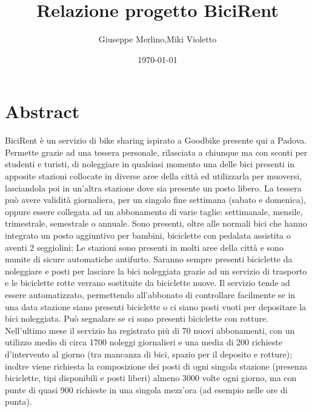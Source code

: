 \documentclass[a4paper,twoside]{article}
\author{Giuseppe Merlino,Miki Violetto}
\title{Relazione progetto BiciRent}
\date{\today}
\begin{document}
\maketitle

\newpage
\tableofcontents
\newpage


\section{Abstract}
BiciRent è un servizio di bike sharing ispirato a Goodbike presente qui a Padova.\newline
Permette grazie ad una tessera personale, rilasciata a chiunque ma con sconti per studenti e turisti, di noleggiare in qualsiasi momento una delle bici presenti in apposite stazioni collocate in diverse aree della città ed utilizzarla per muoversi, lasciandola poi in un'altra stazione dove sia presente un posto libero.\newline
La tessera può avere validità giornaliera, per un singolo fine settimana (sabato e domenica), oppure essere collegata ad un abbonamento di varie taglie: settimanale, mensile, trimestrale, semestrale o  annuale.\newline
Sono presenti, oltre alle normali bici che hanno integrato un posto aggiuntivo per bambini, biciclette con pedalata assistita o aventi 2 seggiolini;\newline
Le stazioni sono presenti in molti aree della città e sono munite di sicure automatiche antifurto. Saranno sempre presenti biciclette da noleggiare e posti per lasciare la bici noleggiata grazie ad un servizio di trasporto e le biciclette rotte verrano sostituite da biciclette nuove.\newline
Il servizio tende ad essere automatizzato, permettendo all'abbonato di controllare facilmente se in una data stazione siano presenti biciclette o ci siano posti vuoti per depositare la bici noleggiata. Può segnalare se ci sono presenti biciclette con rotture.\newline
Nell'ultimo mese il servizio ha registrato più di 70 nuovi abbonamenti, con un utilizzo medio di circa 1700 noleggi giornalieri e una media di 200 richieste d'intervento al giorno (tra mancanza di bici, spazio per il deposito e rotture);\newline
inoltre viene richiesta la composizione dei posti di ogni singola stazione (presenza biciclette, tipi disponibili e posti liberi) almeno 3000 volte ogni giorno, ma con punte di quasi 900 richieste in una singola mezz'ora (ad esempio nelle ore di punta).
\end{document}
